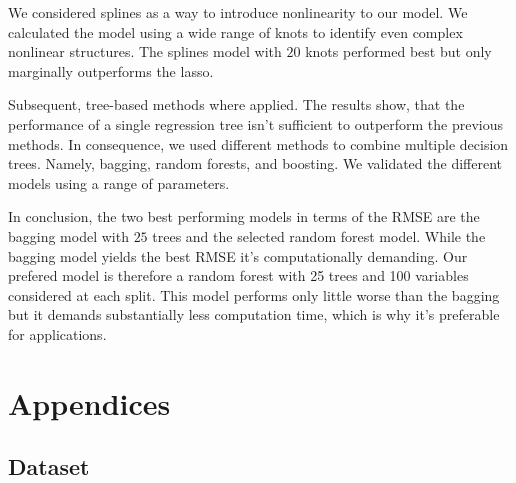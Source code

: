 \documentclass[11pt,]{article}
\begin{document}
We considered splines as a way to introduce nonlinearity to our model.
We calculated the model using a wide range of knots to identify even
complex nonlinear structures. The splines model with \(20\) knots
performed best but only marginally outperforms the \ac{lasso}.

Subsequent, tree-based methods where applied. The results show, that the
performance of a single regression tree isn't sufficient to outperform
the previous methods. In consequence, we used different methods to
combine multiple decision trees. Namely, bagging, random forests, and
boosting. We validated the different models using a range of parameters.

In conclusion, the two best performing models in terms of the \ac{RMSE}
are the bagging model with \(25\) trees and the selected random forest
model. While the bagging model yields the best \ac{RMSE} it's
computationally demanding. Our prefered model is therefore a random
forest with 25 trees and 100 variables considered at each split. This
model performs only little worse than the bagging but it demands
substantially less computation time, which is why it's preferable for
applications.

\pagebreak

\printbibliography[title = References]
\cleardoublepage

\begin{refsection}
\nocite{R-base}
\nocite{R-broom}
\nocite{R-dplyr}
\nocite{R-ggplot2}
\nocite{R-haven}
\nocite{R-lmtest}
\nocite{R-PerformanceAnalytics}
\nocite{R-rstudioapi}
\nocite{R-sandwich}
\nocite{R-stargazer}
\nocite{R-svMisc}
\nocite{R-tidyr}
\nocite{R-xts}
\nocite{R-Studio}
\printbibliography[title = Software-References]
\end{refsection}

\cleardoublepage
\appendix
\setcounter{table}{0}
\setcounter{figure}{0}
\renewcommand{\thetable}{A\arabic{table}}
\renewcommand{\thefigure}{A\arabic{figure}}

\hypertarget{appendices}{%
\section{Appendices}\label{appendices}}

\hypertarget{dataset}{%
\subsection{\texorpdfstring{Dataset
\label{chap:ap1}}{Dataset }}\label{dataset}}
\end{document}
